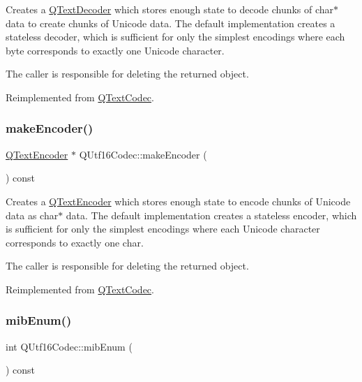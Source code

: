 Creates a \mbox{\hyperlink{class_q_text_decoder}{Q\+Text\+Decoder}} which stores enough state to decode chunks of char$\ast$ data to create chunks of Unicode data. The default implementation creates a stateless decoder, which is sufficient for only the simplest encodings where each byte corresponds to exactly one Unicode character.

The caller is responsible for deleting the returned object. 

Reimplemented from \mbox{\hyperlink{class_q_text_codec_abb65882aa316a2ad49a10e9f86c4dc88}{Q\+Text\+Codec}}.

\mbox{\label{class_q_utf16_codec_a09e6f9d5f05c5a7cf730841b28301ae5}} 
\subsubsection{\texorpdfstring{makeEncoder()}{makeEncoder()}}
{\footnotesize\ttfamily \mbox{\hyperlink{class_q_text_encoder}{Q\+Text\+Encoder}} $\ast$ Q\+Utf16\+Codec\+::make\+Encoder (\begin{DoxyParamCaption}{ }\end{DoxyParamCaption}) const\hspace{0.3cm}{\ttfamily [virtual]}}

Creates a \mbox{\hyperlink{class_q_text_encoder}{Q\+Text\+Encoder}} which stores enough state to encode chunks of Unicode data as char$\ast$ data. The default implementation creates a stateless encoder, which is sufficient for only the simplest encodings where each Unicode character corresponds to exactly one char.

The caller is responsible for deleting the returned object. 

Reimplemented from \mbox{\hyperlink{class_q_text_codec_aa7dccd7fc1b578de0b7599b040d98e11}{Q\+Text\+Codec}}.

\mbox{\label{class_q_utf16_codec_aac5f0273efa632dd14125464094b581e}} 
\subsubsection{\texorpdfstring{mibEnum()}{mibEnum()}}
{\footnotesize\ttfamily int Q\+Utf16\+Codec\+::mib\+Enum (\begin{DoxyParamCaption}{ }\end{DoxyParamCaption}) const\hspace{0.3cm}{\ttfamily [virtual]}}


